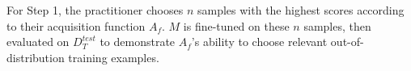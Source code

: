 For Step 1, the practitioner chooses $n$ samples with the highest scores according to their acquisition function $A_f$. 
$M$ is fine-tuned on these $n$ samples, then evaluated on $D_T^{test}$ to demonstrate $A_f$'s ability to choose relevant out-of-distribution training examples.

